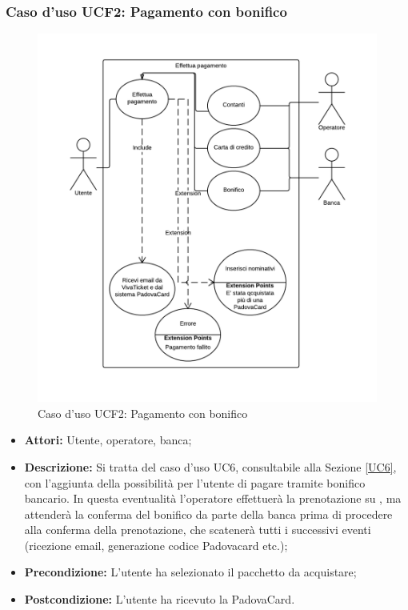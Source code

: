 \subsubsection{Caso d'uso UCF2: Pagamento con bonifico}
\begin{figure}[H]
\centering
\includegraphics[width=1\textwidth]{images/UCF2.png}
\caption{Caso d'uso UCF2: Pagamento con bonifico}
\end{figure}
\begin{itemize}
\item \textbf{Attori:} Utente, operatore, banca;
\item \textbf{Descrizione:} Si tratta del caso d'uso UC6, consultabile alla Sezione \ref{UC6}, con l'aggiunta della possibilità per l'utente di pagare tramite bonifico bancario. In questa eventualità l'operatore effettuerà la prenotazione su \tlite, ma attenderà la conferma del bonifico da parte della banca prima di procedere alla conferma della prenotazione, che scatenerà tutti i successivi eventi (ricezione email, generazione codice Padovacard etc.);
\item \textbf{Precondizione:} L'utente ha selezionato il pacchetto da acquistare;
\item \textbf{Postcondizione:}  L'utente ha ricevuto la PadovaCard.
\end{itemize}


